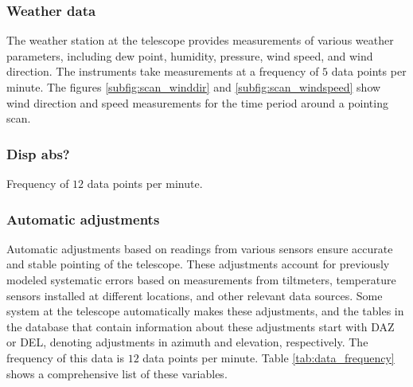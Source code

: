 \subsubsection{Weather data}
The weather station at the telescope provides measurements of various weather parameters, including dew point, humidity, pressure, wind speed, and wind direction.
The instruments take measurements at a frequency of $5$ data points per minute.
The figures \ref{subfig:scan_winddir} and \ref{subfig:scan_windspeed} show wind direction and speed measurements for the time period around a pointing scan.


\subsubsection{Disp abs?}

Frequency of $12$ data points per minute.

\subsubsection{Automatic adjustments}
Automatic adjustments based on readings from various sensors ensure accurate and stable pointing of the telescope.
These adjustments account for previously modeled systematic errors based on measurements from tiltmeters, temperature sensors installed at different locations, and other relevant data sources.
Some system at the telescope automatically makes these adjustments, and the tables in the database that contain information about these adjustments start with DAZ or DEL, denoting adjustments in azimuth and elevation, respectively.
The frequency of this data is $12$ data points per minute.
Table \ref{tab:data_frequency} shows a comprehensive list of these variables.

